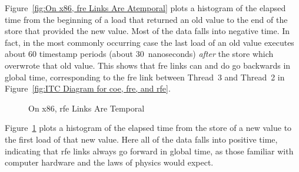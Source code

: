 \documentclass[10]{article}
\begin{document}
Figure~\ref{fig:On x86, fre Links Are Atemporal}
plots a histogram of the elapsed time from the beginning of a load that
returned an old value to the end of the store that provided the new value.
Most of the data falls into negative time.
In fact, in the most commonly occurring case the last load of an old value
executes about 60 timestamp periods (about 30~nanoseconds) \emph{after}
the store which overwrote that old value.
This shows that fre links can and do go backwards in global time,
corresponding to the fre link between Thread~3 and Thread~2 in
Figure~\ref{fig:ITC Diagram for coe, fre, and rfe}.

\begin{figure}[tb]
\begin{center}
\caption{On x86, rfe Links Are Temporal}
\label{fig:On x86, rfe Links Are Temporal}
\end{center}
\end{figure}

Figure~\ref{fig:On x86, rfe Links Are Temporal}
plots a histogram of the elapsed time from the store of a new value
to the first load of that new value.
Here all of the data falls into positive time, indicating
that rfe links always go forward in global time, as those familiar with
computer hardware and the laws of physics would expect.
\end{document}
